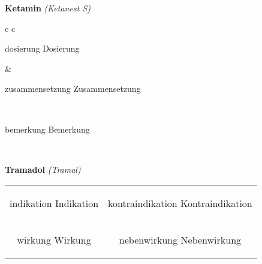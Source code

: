 \documentclass[12pt]{beamer}
\begin{document}
\begin{frame}{
    \textbf{Ketamin}
    \textit{(Ketanest S)}
}
    \begin{tabular}{c c}
        \begin{beamercolorbox}[wd=\boxwidth\textwidth,ht=\boxheight\textheight,sep=1em]{dosierung}
        Dosierung
        \end{beamercolorbox} & 
        \begin{beamercolorbox}[wd=\boxwidth\textwidth,ht=\boxheight\textheight,sep=1em]{zusammensetzung}
        Zusammensetzung
        \end{beamercolorbox} \\
        \begin{beamercolorbox}[wd=\textwidth,ht=\boxheight\textheight,sep=1em]{bemerkung}
        Bemerkung
        \end{beamercolorbox} \\
    \end{tabular}
\end{frame}

\begin{frame}{
    \textbf{Tramadol}
    \textit{(Tramal)}
}
    \begin{tabular}{c c}
        \begin{beamercolorbox}[wd=\boxwidth\textwidth,ht=\boxheight\textheight,sep=1em]{indikation}
        Indikation
        \end{beamercolorbox} & 
        \begin{beamercolorbox}[wd=\boxwidth\textwidth,ht=\boxheight\textheight,sep=1em]{kontraindikation}
        Kontraindikation 
        \end{beamercolorbox} \\
        \begin{beamercolorbox}[wd=\boxwidth\textwidth,ht=\boxheight\textheight,sep=1em]{wirkung}
        Wirkung
        \end{beamercolorbox} & 
        \begin{beamercolorbox}[wd=\boxwidth\textwidth,ht=\boxheight\textheight,sep=1em]{nebenwirkung}
        Nebenwirkung
        \end{beamercolorbox} \\
    \end{tabular}
\end{frame}
\end{document}
